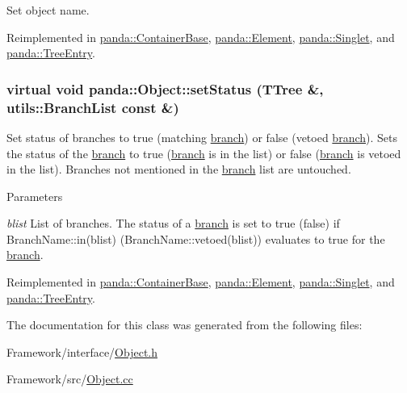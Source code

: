Set object name. 

Reimplemented in \hyperlink{classpanda_1_1ContainerBase_a43e10c3e6286b03ba6906f843318d88a}{panda::ContainerBase}, \hyperlink{classpanda_1_1Element_a16bd41e0e8ade3508f5227533a9c4a03}{panda::Element}, \hyperlink{classpanda_1_1Singlet_a767d4681e6dd335e42b51d24e37b129f}{panda::Singlet}, and \hyperlink{classpanda_1_1TreeEntry_aa0f473dd6eca2ae68ef9b9cb37d909bb}{panda::TreeEntry}.\hypertarget{classpanda_1_1Object_a282e820b1ad431db22ca4d4dd20b55e0}{
\subsubsection[{setStatus}]{\setlength{\rightskip}{0pt plus 5cm}virtual void panda::Object::setStatus (TTree \&, \/  {\bf utils::BranchList} const \&)}}
\label{classpanda_1_1Object_a282e820b1ad431db22ca4d4dd20b55e0}


Set status of branches to true (matching \hyperlink{namespacepanda_1_1branch}{branch}) or false (vetoed \hyperlink{namespacepanda_1_1branch}{branch}). Sets the status of the \hyperlink{namespacepanda_1_1branch}{branch} to true (\hyperlink{namespacepanda_1_1branch}{branch} is in the list) or false (\hyperlink{namespacepanda_1_1branch}{branch} is vetoed in the list). Branches not mentioned in the \hyperlink{namespacepanda_1_1branch}{branch} list are untouched.


\begin{DoxyParams}{Parameters}
\item[{\em blist}]List of branches. The status of a \hyperlink{namespacepanda_1_1branch}{branch} is set to true (false) if BranchName::in(blist) (BranchName::vetoed(blist)) evaluates to true for the \hyperlink{namespacepanda_1_1branch}{branch}. \end{DoxyParams}


Reimplemented in \hyperlink{classpanda_1_1ContainerBase_ac3eae6e2461489f5453fe0680dc2481c}{panda::ContainerBase}, \hyperlink{classpanda_1_1Element_a86dead86ad366a92531c3e7f1f157994}{panda::Element}, \hyperlink{classpanda_1_1Singlet_a7b38d2165f30ed45922939a806708602}{panda::Singlet}, and \hyperlink{classpanda_1_1TreeEntry_a8d65c0ee41e1ef5c7f7a41c454dad052}{panda::TreeEntry}.

The documentation for this class was generated from the following files:\begin{DoxyCompactItemize}
\item 
Framework/interface/\hyperlink{Object_8h}{Object.h}\item 
Framework/src/\hyperlink{Object_8cc}{Object.cc}\end{DoxyCompactItemize}
